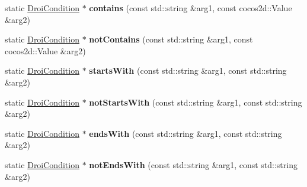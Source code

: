 \begin{DoxyCompactItemize}
\item 
\mbox{\label{class_droi_condition_ae4dd315b249e4aeeb6a83f456bcf471a}} 
static \hyperlink{class_droi_condition}{Droi\+Condition} $\ast$ {\bfseries contains} (const std\+::string \&arg1, const cocos2d\+::\+Value \&arg2)
\item 
\mbox{\label{class_droi_condition_a1c7b443f12363e44f900ce293c243597}} 
static \hyperlink{class_droi_condition}{Droi\+Condition} $\ast$ {\bfseries not\+Contains} (const std\+::string \&arg1, const cocos2d\+::\+Value \&arg2)
\item 
\mbox{\label{class_droi_condition_a4c542aa9557e41bd000fc221409a3f88}} 
static \hyperlink{class_droi_condition}{Droi\+Condition} $\ast$ {\bfseries starts\+With} (const std\+::string \&arg1, const std\+::string \&arg2)
\item 
\mbox{\label{class_droi_condition_a76507a483334406d2208bd86e5b70360}} 
static \hyperlink{class_droi_condition}{Droi\+Condition} $\ast$ {\bfseries not\+Starts\+With} (const std\+::string \&arg1, const std\+::string \&arg2)
\item 
\mbox{\label{class_droi_condition_a5868ca32b4117100bfc71f7245fe62fc}} 
static \hyperlink{class_droi_condition}{Droi\+Condition} $\ast$ {\bfseries ends\+With} (const std\+::string \&arg1, const std\+::string \&arg2)
\item 
\mbox{\label{class_droi_condition_a085f1653cfd7f09161e6f18c799c8b34}} 
static \hyperlink{class_droi_condition}{Droi\+Condition} $\ast$ {\bfseries not\+Ends\+With} (const std\+::string \&arg1, const std\+::string \&arg2)
\end{DoxyCompactItemize}
